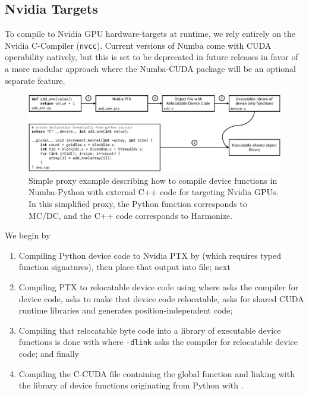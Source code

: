 \subsection{Nvidia Targets}

To compile to Nvidia GPU hardware-targets at runtime, we rely entirely on the Nvidia C-Compiler (\texttt{nvcc}).
Current versions of Numba come with CUDA operability natively, but this is set to be deprecated in future releases in favor of a more modular approach where the Numba-CUDA package will be an optional separate feature.

\begin{figure}
  \centering
  \includegraphics[width=\textwidth]{appendix/mcdc_prof_figs/flownvcc.pdf}
  \caption{Simple proxy example describing how to compile device functions in Numba-Python with external C++ code for targeting Nvidia GPUs. In this simplified proxy, the Python function corresponds to MC/DC, and the C++ code corresponds to Harmonize.}
  \label{fig:codenvcc}
\end{figure}

We begin by
\begin{enumerate}
    \item Compiling Python device code to Nvidia PTX by (which requires typed function signatures), then place that output into  file; next
    
    \item Compiling PTX to relocatable device code using  where  asks the compiler for device code,  asks to make that device code relocatable,  asks for shared CUDA runtime libraries and  generates position-independent code;
    
    \item Compiling that relocatable byte code into a library of executable device functions is done with  where \texttt{-dlink} asks the compiler for relocatable device code; and finally
    
    \item Compiling the C-CUDA file containing the global function and linking with the library of device functions originating from Python with .
    
\end{enumerate}

